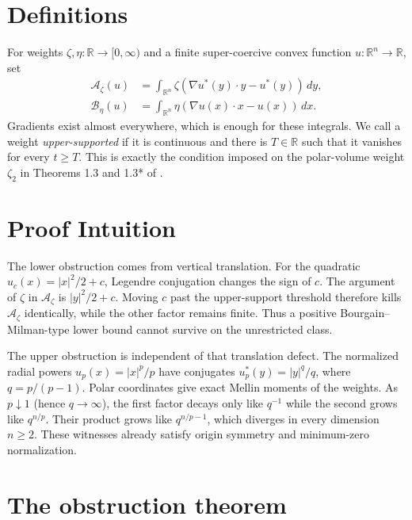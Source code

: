 \documentclass[11pt]{amsart}
\theoremstyle{remark}
\newcommand{\R}{\mathbb R}
\newcommand{\A}{\mathcal A}
\newcommand{\B}{\mathcal B}
\begin{document}
\section*{Definitions}

For weights $\zeta,\eta:\R\to[0,\infty)$ and a finite super-coercive convex
function $u:\R^n\to\R$, set
\begin{align*}
\A_\zeta(u)
  &=\int_{\R^n}
    \zeta\!\left(\nabla u^*(y)\cdot y-u^*(y)\right)\,dy,\\
\B_\eta(u)
  &=\int_{\R^n}
    \eta\!\left(\nabla u(x)\cdot x-u(x)\right)\,dx.
\end{align*}
Gradients exist almost everywhere, which is enough for these integrals.
We call a weight \emph{upper-supported} if it is continuous and there is
$T\in\R$ such that it vanishes for every $t\geq T$.  This is exactly the
condition imposed on the polar-volume weight $\zeta_2$ in Theorems 1.3 and
1.3* of \cite{Mussnig2019}.

\section*{Proof Intuition}

The lower obstruction comes from vertical translation.  For the quadratic
$u_c(x)=|x|^2/2+c$, Legendre conjugation changes the sign of $c$.  The
argument of $\zeta$ in $\A_\zeta$ is $|y|^2/2+c$.  Moving $c$ past the
upper-support threshold therefore kills $\A_\zeta$ identically, while the
other factor remains finite.  Thus a positive Bourgain--Milman-type lower
bound cannot survive on the unrestricted class.

The upper obstruction is independent of that translation defect.  The
normalized radial powers $u_p(x)=|x|^p/p$ have conjugates
$u_p^*(y)=|y|^q/q$, where $q=p/(p-1)$.  Polar coordinates give exact Mellin
moments of the weights.  As $p\downarrow1$ (hence $q\to\infty$), the first
factor decays only like $q^{-1}$ while the second grows like $q^{n/p}$.
Their product grows like $q^{n/p-1}$, which diverges in every dimension
$n\geq2$.  These witnesses already satisfy origin symmetry and minimum-zero
normalization.

\section*{The obstruction theorem}
\end{document}
